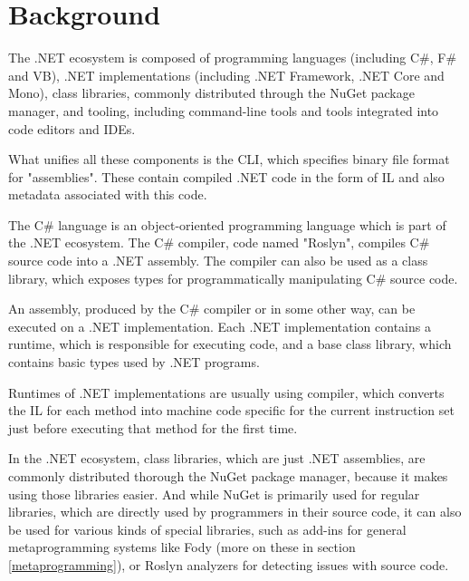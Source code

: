 \chapter{Background}

The .NET ecosystem is composed of programming languages (including C\#, F\# and \acl{VB}), \cite{tour} .NET implementations (including .NET Framework, .NET Core and Mono), \cite{implementations} class libraries, commonly distributed through the NuGet package manager, and tooling, including command-line tools and tools integrated into code editors and \acp{IDE}.

What unifies all these components is the \ac{CLI}, \cite{ecma-335} which specifies binary file format for "assemblies". These contain compiled .NET code in the form of \ac{IL} and also metadata associated with this code.

\medskip

The C\# language \cite{csharp-spec} is an object-oriented programming language which is part of the .NET ecosystem.
The C\# compiler, code named "Roslyn", \cite{roslyn} compiles C\# source code into a .NET assembly. The compiler can also be used as a class library, which exposes types for programmatically manipulating C\# source code.

\medskip

An assembly, produced by the C\# compiler or in some other way, can be executed on a .NET implementation. Each .NET implementation contains a runtime, which is responsible for executing code, and a base class library, which contains basic types used by .NET programs.

Runtimes of .NET implementations are usually using  compiler, which converts the \ac{IL} for each method into machine code specific for the current instruction set just before executing that method for the first time. %

\medskip

In the .NET ecosystem, class libraries, which are just .NET assemblies, are commonly distributed thorough the NuGet package manager, \cite{nuget} because it makes using those libraries easier.
And while NuGet is primarily used for regular libraries, which are directly used by programmers in their source code, it can also be used for various kinds of special libraries, such as add-ins for general metaprogramming systems like Fody (more on these in section \ref{metaprogramming}), or Roslyn analyzers for detecting issues with source code.

